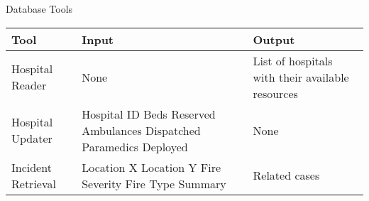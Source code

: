 \begin{frame}{Database Tools}
    \begin{table}[]
        \begin{tabular}{|m{}|m{}|m{}|}
            \hline
            \textbf{Tool} & \textbf{Input} & \textbf{Output} \\ \hline
            Hospital Reader & None & List of hospitals with their available resources \\ \hline
            Hospital Updater & Hospital ID \newline Beds Reserved \newline Ambulances Dispatched \newline Paramedics Deployed & None \\ \hline
            Incident Retrieval & Location X \newline Location Y \newline Fire Severity \newline Fire Type \newline Summary & Related cases \\ \hline
        \end{tabular}
    \end{table}
\end{frame}
